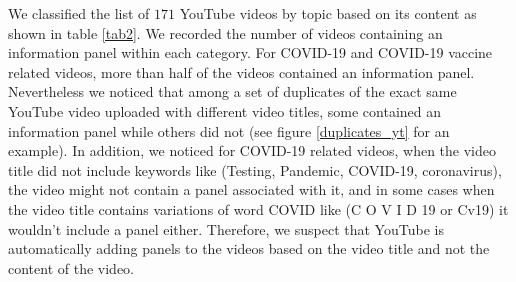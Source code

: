 \documentclass{article}
\begin{document}
We classified the list of $171$ YouTube videos by topic based on its content as shown in table \ref{tab2}. We recorded the number of videos containing an information panel within each category. For COVID-19 and COVID-19 vaccine related videos, more than half of the videos contained an information panel. Nevertheless we noticed that among a set of duplicates of the exact same YouTube video uploaded with different video titles, some contained an information panel while others did not (see figure \ref{duplicates_yt} for an example).  
In addition, we noticed for COVID-19 related videos, when the video title did not include keywords like (Testing, Pandemic, COVID-19, coronavirus), the video might not contain a panel associated with it, and in some cases when the video title contains variations of word COVID like (C O V I D 19 or Cv19) it wouldn’t include a panel either. Therefore, we suspect that YouTube is automatically adding panels to the videos based on the video title and not the content of the video.
\end{document}
